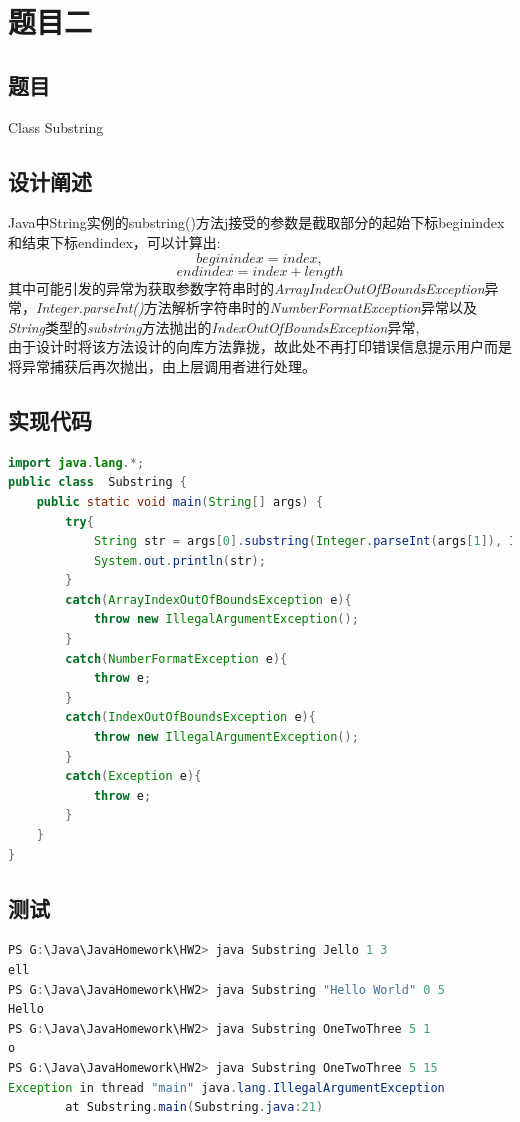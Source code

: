 \documentclass[a4paper]{article}
\begin{document}
\section{题目二}

\subsection{题目}

Class Substring

\subsection{设计阐述}
Java中String实例的substring()方法j接受的参数是截取部分的起始下标beginindex和结束下标endindex，可以计算出:\[beginindex=index,\] \[endindex=index+length\]
其中可能引发的异常为获取参数字符串时的\emph{ArrayIndexOutOfBoundsException}异常，\emph{Integer.parseInt()}方法解析字符串时的\emph{NumberFormatException}异常以及\emph{String}类型的\emph{substring}方法抛出的\emph{IndexOutOfBoundsException}异常,\\
由于设计时将该方法设计的向库方法靠拢，故此处不再打印错误信息提示用户而是将异常捕获后再次抛出，由上层调用者进行处理。
\subsection{实现代码}

\begin{lstlisting}[language=Java]
import java.lang.*;
public class  Substring {
    public static void main(String[] args) {
        try{
            String str = args[0].substring(Integer.parseInt(args[1]), Integer.parseInt(args[1]) + Integer.parseInt(args[2]));
            System.out.println(str);
        }
        catch(ArrayIndexOutOfBoundsException e){
            throw new IllegalArgumentException();
        }
        catch(NumberFormatException e){
            throw e;
        }
        catch(IndexOutOfBoundsException e){
            throw new IllegalArgumentException();
        }
        catch(Exception e){
            throw e;
        }
    }
}
\end{lstlisting}

\subsection{测试}

\begin{lstlisting}[language=Java,numbers=none]
PS G:\Java\JavaHomework\HW2> java Substring Jello 1 3
ell
PS G:\Java\JavaHomework\HW2> java Substring "Hello World" 0 5
Hello
PS G:\Java\JavaHomework\HW2> java Substring OneTwoThree 5 1
o
PS G:\Java\JavaHomework\HW2> java Substring OneTwoThree 5 15
Exception in thread "main" java.lang.IllegalArgumentException
        at Substring.main(Substring.java:21)
\end{lstlisting}
\end{document}
